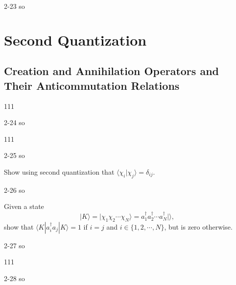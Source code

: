 \documentclass[a4paper]{book}
\begin{document}
	\begin{solution}
		2-23 so
	\end{solution}
	
	\section{Second Quantization}
	
	\subsection{Creation and Annihilation Operators and Their Anticommutation Relations}
	
	\begin{exercise}
	111
	\end{exercise}
	
	\begin{solution}
		2-24 so
	\end{solution}
	
	\begin{exercise}
	111
	\end{exercise}
	
	\begin{solution}
		2-25 so
	\end{solution}
	
	\begin{exercise}
	Show using second quantization that $\langle \chi_i | \chi_j \rangle = \delta_{ij}$.
	\end{exercise}
	
	\begin{solution}
		2-26 so
	\end{solution}

	\begin{exercise}
	Given a state 
	\[
		| K \rangle = | \chi_1 \chi_2 \cdots \chi_N \rangle = a^\dagger_1 a^\dagger_2 \cdots a^\dagger_N | \rangle,
	\]
	show that $\langle K | a^\dagger_i a_j | K \rangle = 1$ if $i=j$ and $i \in \{ 1 , 2 , \cdots, N \}$, but is zero otherwise.
	\end{exercise}
	
	\begin{solution}
		2-27 so
	\end{solution}
	
	\begin{exercise}
	111
	\end{exercise}
	
	\begin{solution}
		2-28 so
	\end{solution}
	
\end{document}
